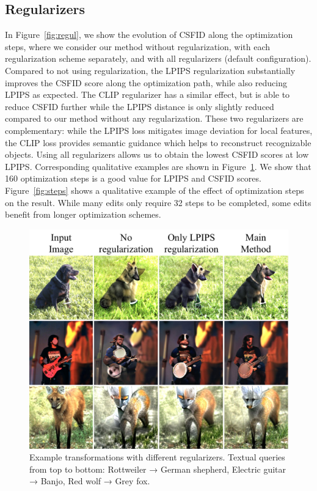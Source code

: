 \subsection{Regularizers}
In Figure~\ref{fig:regul}, we show the evolution of \ac{CSFID} along the optimization steps, 
where we consider our method without regularization, with each regularization scheme 
separately, and with all regularizers (default configuration).
Compared to not using regularization, the \ac{LPIPS} regularization substantially improves
 the \ac{CSFID} score along the optimization path, while also reducing \ac{LPIPS} as expected. 
The \ac{CLIP} regularizer has a similar effect, but is able to reduce  \ac{CSFID} further while
 the \ac{LPIPS} distance is only slightly reduced compared to our method without any 
 regularization.
These two regularizers are complementary: while the \ac{LPIPS} loss mitigates image 
deviation for local features, the \ac{CLIP} loss provides semantic guidance which helps to 
reconstruct recognizable objects. %
Using all regularizers allows us to obtain the lowest \ac{CSFID} scores at low \ac{LPIPS}. 
Corresponding qualitative examples are shown in Figure~\ref{fig:demo_reg}. We show that 160 
optimization steps is a good value for \ac{LPIPS} and \ac{CSFID} scores. Figure~\ref{fig:steps} shows a 
qualitative example of the effect of optimization steps on the result. While many edits only require 32 steps to be 
completed, some edits benefit from longer optimization schemes.


\begin{figure}[h]
    \centering
    \includegraphics[width=\linewidth]{images/flexit/assets/demo_reg2.pdf}
    \caption{Example transformations with different regularizers. Textual queries from top to bottom: Rottweiler → German shepherd, Electric guitar → Banjo, Red wolf → Grey fox.
    }
\label{fig:demo_reg}
\end{figure}


